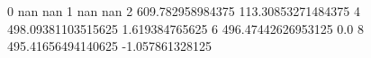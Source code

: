 0 nan nan
1 nan nan
2 609.782958984375 113.30853271484375
4 498.09381103515625 1.619384765625
6 496.47442626953125 0.0
8 495.41656494140625 -1.057861328125
